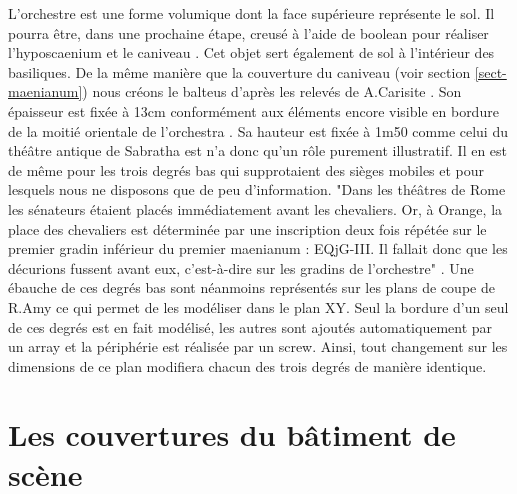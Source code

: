 L'orchestre est une forme volumique dont la face supérieure représente le sol. Il pourra être, dans une prochaine étape, creusé à l'aide de \gls{boolean} pour réaliser l'\gls{hyposcaenium} et le caniveau \cite[Chap. VI]{orangeTxt}. Cet objet sert également de sol à l'intérieur des \glspl{basilique}. De la même manière que la couverture du caniveau (voir section \ref{sect-maenianum}) nous créons le \gls{balteus} d'après les relevés de A.Carisite \cite[Pl. I]{orangePl}. Son épaisseur est fixée à 13cm conformément aux éléments encore visible en bordure de la moitié orientale de l'\gls{orchestra} \cite[p. 340]{orangeTxt}. Sa hauteur est fixée à 1m50 comme celui du théâtre antique de Sabratha \cite[p. 96]{lachaux} est n'a donc qu'un rôle purement illustratif. Il en est de même pour les trois degrés bas qui supprotaient des sièges mobiles et pour lesquels nous ne disposons que de peu d'information. "Dans les théâtres de Rome les sénateurs étaient placés immédiatement avant les chevaliers. Or, à Orange, la place des chevaliers est déterminée par une inscription deux fois répétée sur le premier gradin inférieur du premier \gls{maenianum} : EQjG-III. Il fallait donc que les décurions fussent avant eux, c'est-à-dire sur les gradins de l'orchestre" \cite[p.46]{formige}. Une ébauche de ces degrés bas sont néanmoins représentés sur les plans de coupe de R.Amy \cite[PL. XVI]{orangePl} ce qui permet de les modéliser dans le plan XY. Seul la bordure d'un seul de ces degrés est en fait modélisé, les autres sont ajoutés automatiquement par un \gls{array} et la périphérie est réalisée par un \gls{screw}. Ainsi, tout changement sur les dimensions de ce plan modifiera chacun des trois degrés de manière identique.

\section{Les couvertures du bâtiment de scène}
\label{sect-couverture}

